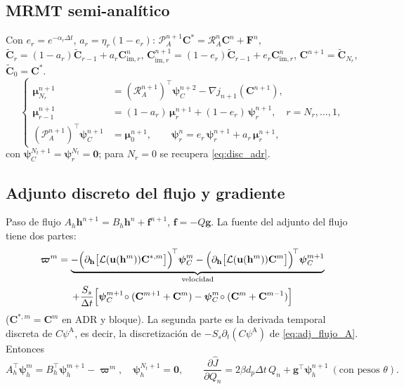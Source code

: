 \documentclass[11pt]{article}
\numberwithin{equation}{section}
\theoremstyle{remark}
\newcommand{\bu}{\mathbf{u}}
\newcommand{\im}{\mathrm{im}}
\newcommand{\pA}{\psi^{\mathrm{A}}}    %
\begin{document}
\subsection*{MRMT semi-anal\'itico}
Con $e_r=e^{-\alpha_r\Delta t}$, $a_r=\eta_r(1-e_r)$: $\mathcal{P}_A^{n+1}\mathbf{C}^*=\mathcal{R}_A^{n}\mathbf{C}^n+\mathbf{F}^n$, $\tilde{\mathbf{C}}_r=(1-a_r)\tilde{\mathbf{C}}_{r-1}+a_r\mathbf{C}^n_{\im,r}$, $\mathbf{C}^{n+1}_{\im,r}=(1-e_r)\tilde{\mathbf{C}}_{r-1}+e_r\mathbf{C}^n_{\im,r}$, $\mathbf{C}^{n+1}=\tilde{\mathbf{C}}_{N_r}$, $\tilde{\mathbf C}_0=\mathbf C^*$.
\begin{equation}
\left\{\begin{aligned}
\boldsymbol\mu_{N_r}^{n+1}&=(\mathcal{R}_A^{n+1})^\top\boldsymbol\psi_C^{n+2}-\nabla j_{n+1}(\mathbf{C}^{n+1}),\\
\boldsymbol\mu_{r-1}^{n+1}&=(1-a_r)\,\boldsymbol\mu_r^{n+1}+(1-e_r)\,\boldsymbol\psi_r^{n+1},\quad r=N_r,\dots,1,\\
(\mathcal{P}_A^{n+1})^\top\boldsymbol\psi_C^{n+1}&=\boldsymbol\mu_0^{n+1},\qquad
\boldsymbol\psi_r^{n}=e_r\,\boldsymbol\psi_r^{n+1}+a_r\,\boldsymbol\mu_r^{n+1},
\end{aligned}\right.
\label{eq:disc_semi}
\end{equation}
con $\boldsymbol\psi_C^{N_t+1}=\boldsymbol\psi_r^{N_t}=\mathbf{0}$; para $N_r=0$ se recupera \eqref{eq:disc_adr}.

\subsection*{Adjunto discreto del flujo y gradiente}
Paso de flujo $A_h\mathbf{h}^{n+1}=B_h\mathbf{h}^n+\mathbf{f}^{n+1}$, $\mathbf{f}=-Q\mathbf{g}$. La fuente del adjunto del flujo tiene dos partes:
\begin{multline}
\boldsymbol\varpi^{m}=\underbrace{-\Bigl(\partial_{\mathbf{h}}\bigl[\mathcal{L}(\bu(\mathbf{h}^m))\mathbf{C}^{*,m}\bigr]\Bigr)^{\!\top}\boldsymbol\psi_C^{m}
-\Bigl(\partial_{\mathbf{h}}\bigl[\mathcal{L}(\bu(\mathbf{h}^m))\mathbf{C}^{m}\bigr]\Bigr)^{\!\top}\boldsymbol\psi_C^{m+1}}_{\text{velocidad}}\\
+\frac{S_s}{\Delta t}\Bigl[\boldsymbol\psi_C^{m+1}\!\circ(\mathbf{C}^{m+1}+\mathbf{C}^m)-\boldsymbol\psi_C^{m}\!\circ(\mathbf{C}^{m}+\mathbf{C}^{m-1})\Bigr]
\end{multline}
($\mathbf{C}^{*,m}=\mathbf{C}^m$ en ADR y bloque). La segunda parte es la derivada temporal discreta de $C\pA$, es decir, la discretizaci\'on de $-S_s\partial_t(C\pA)$ de \eqref{eq:adj_flujo_A}. Entonces
\begin{equation}
A_h^\top\boldsymbol\psi_h^{m}=B_h^\top\boldsymbol\psi_h^{m+1}-\boldsymbol\varpi^{m},\quad\boldsymbol\psi_h^{N_t+1}=\mathbf{0},\qquad
\frac{\partial\hat J}{\partial Q_n}=2\beta d_p\Delta t\,Q_n+\mathbf{g}^\top\boldsymbol\psi_h^{n+1}\ (\text{con pesos }\theta).
\label{eq:disc_flujo}
\end{equation}
\end{document}

